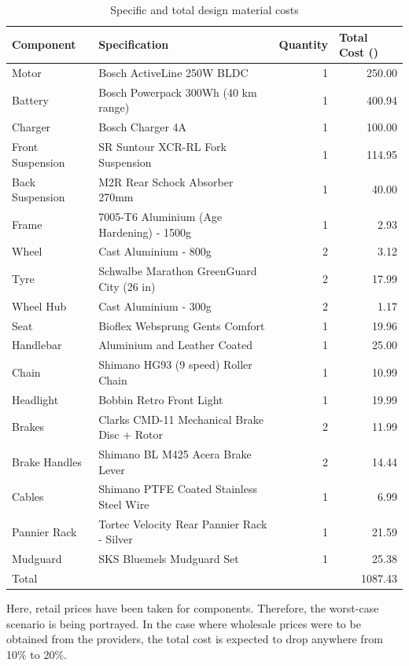 \documentclass[a4paper,11pt]{article}
\begin{document}
\begin{table}[!ht]
	\centering
	\caption{Specific and total design material costs}
	\begin{tabular}{l l r r}
		\hline
		\multicolumn{1}{l}{Component}&\multicolumn{1}{l}{Specification}&\multicolumn{1}{l}{Quantity}&\multicolumn{1}{l}{Total Cost (\textsterling)}\\\hline
		Motor&Bosch ActiveLine 250W BLDC&1&250.00\\
		Battery&Bosch Powerpack 300Wh (40 km range)&1&400.94\\
		Charger&Bosch Charger 4A&1&100.00\\
		Front Suspension&SR Suntour XCR-RL Fork Suspension&1&114.95\\
		Back Suspension&M2R Rear Schock Absorber 270mm&1&40.00\\
		Frame&7005-T6 Aluminium (Age Hardening) - 1500g&1&2.93\\
		Wheel&Cast Aluminium - 800g&2&3.12\\
		Tyre&Schwalbe Marathon GreenGuard City (26 in)&2&17.99\\
		Wheel Hub&Cast Aluminium - 300g&2&1.17\\
		Seat&Bioflex Websprung Gents Comfort&1&19.96\\
		Handlebar&Aluminium and Leather Coated&1&25.00\\
		Chain&Shimano HG93 (9 speed) Roller Chain&1&10.99\\
		Headlight&Bobbin Retro Front Light&1&19.99\\
		Brakes&Clarks CMD-11 Mechanical Brake Disc + Rotor&2&11.99\\
		Brake Handles&Shimano BL M425 Acera Brake Lever&2&14.44\\
		Cables&Shimano PTFE Coated Stainless Steel Wire&1&6.99\\
		Pannier Rack&Tortec Velocity Rear Pannier Rack - Silver&1&21.59\\
		Mudguard&SKS Bluemels Mudguard Set&1&25.38\\\hline
		Total&&&1087.43\\\hline
	\end{tabular}
\end{table}

Here, retail prices have been taken for components. Therefore, the worst-case scenario is being portrayed. In the case where wholesale prices were to be obtained from the providers, the total cost is expected to drop anywhere from 10\% to 20\%. 

\newpage
\end{document}
